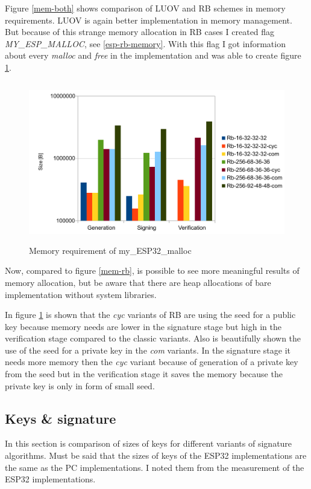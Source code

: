 \documentclass[thesis=M,english]{FITthesis}[2019/12/23]
\begin{document}
\noindent
Figure \ref{mem-both} shows comparison of LUOV and RB schemes in memory requirements. LUOV is again better implementation in memory management. But because of this strange memory allocation in RB cases I created flag \textit{MY\_ESP\_MALLOC}, see \ref{esp-rb-memory}. With this flag I got information about every \textit{malloc} and \textit{free} in the implementation and was able to create figure \ref{mem-my-alloc}.

\begin{figure}[H]
\centering
\includegraphics[width=13cm,height=7cm]{images/mem-my_esp_malloc.pdf}
\caption{Memory requirement of my\_ESP32\_malloc}
\label{mem-my-alloc}
\end{figure}

\noindent
Now, compared to figure \ref{mem-rb}, is possible to see more meaningful results of memory allocation, but be aware that there are heap allocations of bare implementation without system libraries.

\bigskip
\noindent
In figure \ref{mem-my-alloc} is shown that the \textit{cyc} variants of RB are using the seed for a public key because memory needs are lower in the signature stage but high in the verification stage compared to the classic variants. Also is beautifully shown the use of the seed for a private key in the \textit{com} variants. In the signature stage it needs more memory then the \textit{cyc} variant because of generation of a private key from the seed but in the verification stage it saves the memory because the private key is only in form of small seed.

\subsection{Keys \& signature} \label{key_sign}
In this section is comparison of sizes of keys for different variants of signature algorithms. Must be said that the sizes of keys of the ESP32 implementations are the same as the PC implementations. I noted them from the measurement of the ESP32 implementations.
\end{document}
